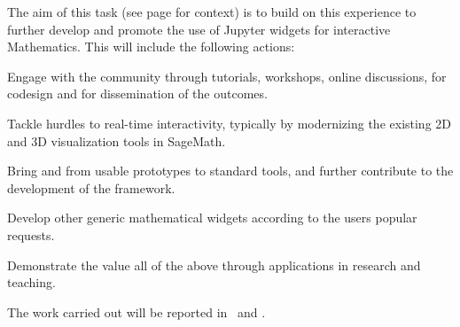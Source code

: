 \begin{task}[
  title=Demonstrator: Interactive Mathematics with Jupyter Widgets,
  id=math,
  lead=UPSUD,
  PM=15, %
  wphases={0-36},
  partners={EGI,EP,QS}
  ]

  The aim of this task (see page
  \pageref{sec:concept-demonstrator-math} for context)
  is to build on this experience to further
  develop and promote the use of Jupyter widgets for interactive
  Mathematics. This will include the following actions:
  \begin{compactitem}
  \item Engage with the community through tutorials, workshops, online
    discussions, for codesign and for dissemination of the outcomes.
  \item Tackle hurdles to real-time interactivity, typically by
    modernizing the existing 2D and 3D visualization tools in
    SageMath. %
  \item Bring  and
     from usable prototypes to standard tools,
    and further contribute to the development of the 
    framework.
  \item Develop other generic mathematical widgets according to the
    users popular requests.
  \item Demonstrate the value all of the above through applications in
    research and teaching.
  \end{compactitem}
  The work carried out will be reported in~ and .
\end{task}
